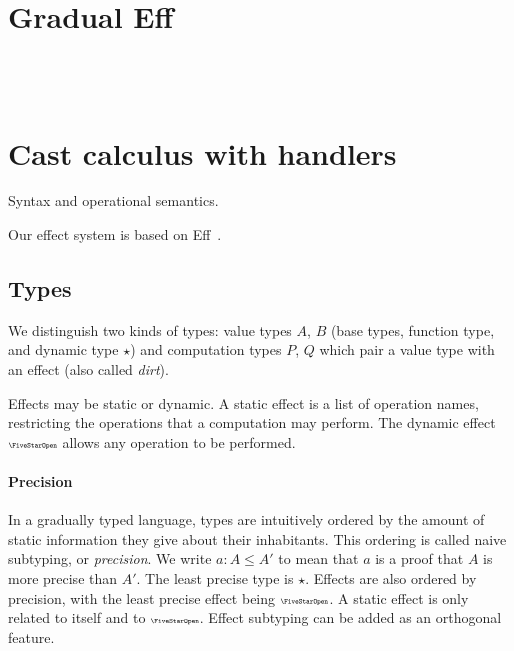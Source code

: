 \section{Gradual Eff}

\GEmetavars\\[0pt]
\GEgrammar\\[5.0mm]
\GEdefnss

\section{Cast calculus with handlers}

Syntax and operational semantics.

Our effect system is based on Eff~\cite{bauer2015programming}.

\subsection{Types}

We distinguish two kinds of types: value types $A$, $B$ (base types, function type, and
dynamic type $\star$) and computation types $P$, $Q$ which pair a value type with an effect (also called \emph{dirt}).

Effects may be static or dynamic. A static effect is a list of operation names,
restricting the operations that a computation may perform. The dynamic effect $\effany$
allows any operation to be performed.

\paragraph{Precision}
In a gradually typed language, types are intuitively ordered by the amount of
static information they give about their inhabitants. This ordering is called
naive subtyping, or \emph{precision}.
We write $a : A \le A'$ to mean that $a$ is a proof that $A$ is more precise than $A'$.
The least precise type is $\star$.
Effects are also ordered by precision, with the least precise effect being $\effany$.
A static effect is only related to itself and to $\effany$.
Effect subtyping can be added as an orthogonal feature.

